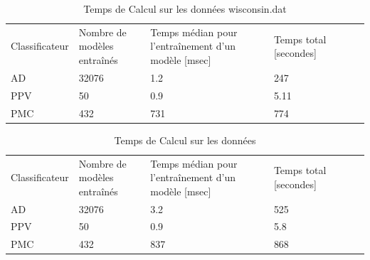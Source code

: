 \documentclass[10pt,letterpaper]{article}
\newlength\savedwidth
\newcommand\thickhline{\noalign{\global\savedwidth\arrayrulewidth\global\arrayrulewidth 2pt}%
\hline
\noalign{\global\arrayrulewidth\savedwidth}}
\begin{document}
\begin{table}[H]
  \centering
  \caption{Temps de Calcul sur les données wisconsin.dat}
  \begin{adjustbox}{width=\textwidth}
\begin{tabular}{lllll}
\hline
Classificateur & \thead{Nombre de \\modèles entraînés} &
\thead{Temps médian pour \\l’entraînement d’un modèle [msec]} &
Temps total [secondes]
\\ \thickhline
AD & \hspace{5mm}32076 & \hspace{20mm}1.2 & \hspace{10mm}247  \\ \hline
PPV & \hspace{5mm}50 & \hspace{20mm}0.9 & \hspace{10mm}5.11\\ \hline
PMC & \hspace{5mm}432 & \hspace{20mm}731 & \hspace{10mm}774\\ \hline
\end{tabular}
\end{adjustbox}
\end{table}

\begin{table}[h]
  \centering
  \caption{Temps de Calcul sur les données \protect{}}
  \begin{adjustbox}{width=\textwidth}
\begin{tabular}{lllll}
\hline
Classificateur & \thead{Nombre de \\modèles entraînés} &
\thead{Temps médian pour \\l’entraînement d’un modèle [msec]} &
Temps total [secondes]
\\ \thickhline
AD & \hspace{5mm}32076 & \hspace{20mm}3.2 & \hspace{10mm}525  \\ \hline
PPV & \hspace{5mm}50 & \hspace{20mm}0.9 & \hspace{10mm}5.8\\ \hline
PMC & \hspace{5mm}432 & \hspace{20mm}837 & \hspace{10mm}868\\ \hline
\end{tabular}
\end{adjustbox}
\end{table}
\end{document}
